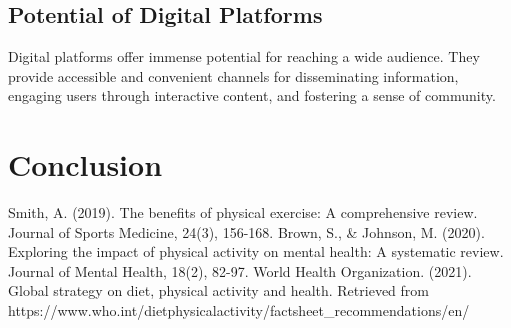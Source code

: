 \documentclass{article}
\begin{document}
\subsection{Potential of Digital Platforms\cite{ref6}}
Digital platforms offer immense potential for reaching a wide audience. They provide accessible and convenient channels for disseminating information, engaging users through interactive content, and fostering a sense of community.


\section{Conclusion}


\begin{thebibliography}{9}
 Smith, A. (2019). The benefits of physical exercise: A comprehensive review. Journal of Sports Medicine, 24(3), 156-168.
 Brown, S., \& Johnson, M. (2020). Exploring the impact of physical activity on mental health: A systematic review. Journal of Mental Health, 18(2), 82-97.
 World Health Organization. (2021). Global strategy on diet, physical activity and health. Retrieved from https://www.who.int/dietphysicalactivity/factsheet_recommendations/en/
\end{thebibliography}
\end{document}

